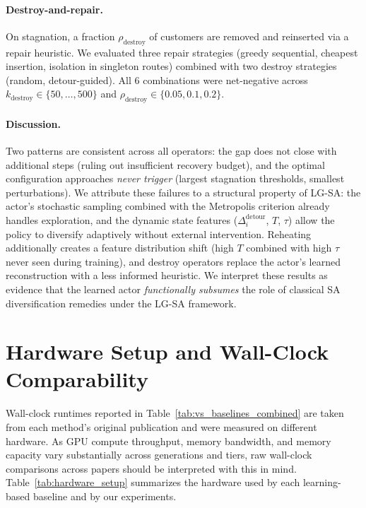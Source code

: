 \documentclass[letterpaper]{article} %
\begin{document}
\paragraph{Destroy-and-repair.}
On stagnation, a fraction $\rho_{\text{destroy}}$ of customers are removed and reinserted via a repair heuristic. We evaluated three repair strategies (greedy sequential, cheapest insertion, isolation in singleton routes) combined with two destroy strategies (random, detour-guided). All $6$ combinations were net-negative across $k_{\text{destroy}} \in \{50,\ldots,500\}$ and $\rho_{\text{destroy}} \in \{0.05, 0.1, 0.2\}$. 


\paragraph{Discussion.}
Two patterns are consistent across all operators: the gap does not close with additional steps (ruling out insufficient recovery budget), and the optimal configuration approaches \emph{never trigger} (largest stagnation thresholds, smallest perturbations). We attribute these failures to a structural property of LG-SA: the actor's stochastic sampling combined with the Metropolis criterion already handles exploration, and the dynamic state features ($\Delta^{\text{detour}}_i$, $T$, $\tau$) allow the policy to diversify adaptively without external intervention. Reheating additionally creates a feature distribution shift (high $T$ combined with high $\tau$ never seen during training), and destroy operators replace the actor's learned reconstruction with a less informed heuristic. We interpret these results as evidence that the learned actor \emph{functionally subsumes} the role of classical SA diversification remedies under the LG-SA framework.

\section{Hardware Setup and Wall-Clock Comparability}
\label{sec:appendix_hardware}

Wall-clock runtimes reported in Table~\ref{tab:vs_baselines_combined} are taken from each method's original publication and were measured on different hardware. As GPU compute throughput, memory bandwidth, and memory capacity vary substantially across generations and tiers, raw wall-clock comparisons across papers should be interpreted with this in mind. Table~\ref{tab:hardware_setup} summarizes the hardware used by each learning-based baseline and by our experiments.
\end{document}
